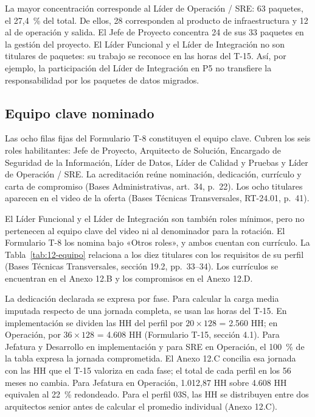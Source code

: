 
La mayor concentración corresponde al Líder de Operación / SRE: 63 paquetes, el 27,4~\% del total. De ellos, 28 corresponden al producto de infraestructura y 12 al de operación y salida. El Jefe de Proyecto concentra 24 de sus 33 paquetes en la gestión del proyecto. El Líder Funcional y el Líder de Integración no son titulares de paquetes: su trabajo se reconoce en las horas del T-15. Así, por ejemplo, la participación del Líder de Integración en P5 no transfiere la responsabilidad por los paquetes de datos migrados.

\subsection{Equipo clave nominado}

Las ocho filas fijas del Formulario T-8 constituyen el equipo clave. Cubren los seis roles habilitantes: Jefe de Proyecto, Arquitecto de Solución, Encargado de Seguridad de la Información, Líder de Datos, Líder de Calidad y Pruebas y Líder de Operación / SRE. La acreditación reúne nominación, dedicación, currículo y carta de compromiso (Bases Administrativas, art.~34, p.~22). Los ocho titulares aparecen en el video de la oferta (Bases Técnicas Transversales, RT-24.01, p.~41).

El Líder Funcional y el Líder de Integración son también roles mínimos, pero no pertenecen al equipo clave del video ni al denominador para la rotación. El Formulario T-8 los nomina bajo «Otros roles», y ambos cuentan con currículo. La Tabla~\ref{tab:12-equipo} relaciona a los diez titulares con los requisitos de su perfil (Bases Técnicas Transversales, sección 19.2, pp.~33--34). Los currículos se encuentran en el Anexo 12.B y los compromisos en el Anexo 12.D.


La dedicación declarada se expresa por fase. Para calcular la carga media imputada respecto de una jornada completa, se usan las horas del T-15. En implementación se dividen las HH del perfil por \(20 \times 128\) = 2.560 HH; en Operación, por \(36 \times 128\) = 4.608 HH (Formulario T-15, sección 4.1). Para Jefatura y Desarrollo en implementación y para SRE en Operación, el 100~\% de la tabla expresa la jornada comprometida. El Anexo 12.C concilia esa jornada con las HH que el T-15 valoriza en cada fase; el total de cada perfil en los 56 meses no cambia. Para Jefatura en Operación, 1.012,87 HH sobre 4.608 HH equivalen al 22~\% redondeado. Para el perfil 03S, las HH se distribuyen entre dos arquitectos senior antes de calcular el promedio individual (Anexo 12.C).

